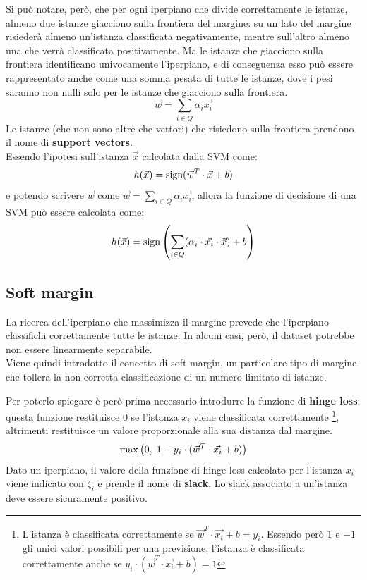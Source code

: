 Si può notare, però, che per ogni iperpiano che divide correttamente le istanze,
almeno due istanze giacciono sulla frontiera del margine: su un lato del margine
risiederà almeno un'istanza classificata negativamente, mentre sull'altro almeno
una che verrà classificata positivamente.
Ma le istanze che giacciono sulla frontiera identificano univocamente
l'iperpiano, e di conseguenza esso può essere rappresentato anche come una somma
pesata di tutte le istanze, dove i pesi saranno non nulli solo per le istanze
che giacciono sulla frontiera.
\[
    \Vec{w} = \sum\limits_{i \in Q} \alpha_i \Vec{x_i}
\]
Le istanze (che non sono altre che vettori) che risiedono sulla frontiera
prendono il nome di \textbf{support vectors}.\\
Essendo l'ipotesi sull'istanza $\Vec{x}$ calcolata dalla SVM come:
\[
    h(\Vec{x}) = \textnormal{sign}(\Vec{w}^T \cdot \Vec{x} + b)
\]
e potendo scrivere 
$\Vec{w}$ come $\Vec{w} = \sum\limits_{i \in Q} \alpha_i \Vec{x_i}$,
allora la funzione di decisione di una SVM può essere calcolata come:
\[
    h(\Vec{x}) = 
    \textnormal{sign}\left(\sum\limits_{i \in Q} (\alpha_i \cdot \Vec{x_i} \cdot \Vec{x}) + b\right)
\]

\subsection{Soft margin}
La ricerca dell'iperpiano che massimizza il margine prevede che l'iperpiano
classifichi correttamente tutte le istanze. In alcuni casi, però, il dataset
potrebbe non essere linearmente separabile.\\
Viene quindi introdotto il concetto di soft margin, un particolare tipo di
margine che tollera la non corretta classificazione di un numero limitato di
istanze.

Per poterlo spiegare è però prima necessario introdurre la funzione di
\textbf{hinge loss}: questa funzione restituisce $0$ se l'istanza $x_i$ viene
classificata correttamente \footnote{L'istanza è classificata correttamente se
$\Vec{w}^T \cdot \Vec{x_i} + b = y_i$. Essendo però $1$ e $-1$ gli unici valori
possibili per una previsione, l'istanza è classificata correttamente anche se
$y_i \cdot (\Vec{w}^T \cdot \Vec{x_i} + b) = 1$}, altrimenti restituisce un
valore proporzionale alla sua distanza dal margine.
\[
    \max \left(0, \; 1 - y_i \cdot (\Vec{w}^T \cdot \Vec{x_i} + b)\right)
\]
Dato un iperpiano, il valore della funzione di hinge loss calcolato per
l'istanza $x_i$ viene indicato con $\zeta_i$ e prende il nome di \textbf{slack}.
Lo slack associato a un'istanza deve essere sicuramente positivo.

